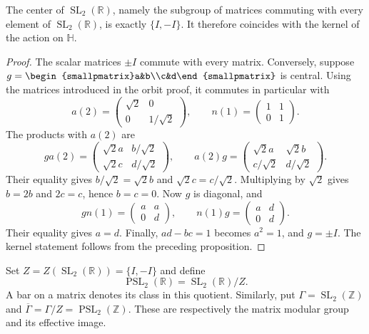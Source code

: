 \begin{proposition}\label{hyperbolic.center}
The center of $\operatorname{SL}_2(\mathbb R)$, namely the subgroup of matrices commuting with every element of $\operatorname{SL}_2(\mathbb R)$, is exactly $\{I,-I\}$. It therefore coincides with the kernel of the action on $\mathbb H$.
\end{proposition}

\begin{proof}
The scalar matrices $\pm I$ commute with every matrix. Conversely, suppose $g=\begin{smallpmatrix}a&b\\c&d\end{smallpmatrix}$ is central. Using the matrices introduced in the orbit proof, it commutes in particular with
\[
 a(2)=\begin{pmatrix}\sqrt2&0\\0&1/\sqrt2\end{pmatrix},\qquad
 n(1)=\begin{pmatrix}1&1\\0&1\end{pmatrix}.
\]
The products with $a(2)$ are
\[
 ga(2)=\begin{pmatrix}\sqrt2 a&b/\sqrt2\\\sqrt2 c&d/\sqrt2\end{pmatrix},\qquad
 a(2)g=\begin{pmatrix}\sqrt2 a&\sqrt2 b\\c/\sqrt2&d/\sqrt2\end{pmatrix}.
\]
Their equality gives $b/\sqrt2=\sqrt2 b$ and $\sqrt2 c=c/\sqrt2$. Multiplying by $\sqrt2$ gives $b=2b$ and $2c=c$, hence $b=c=0$. Now $g$ is diagonal, and
\[
 gn(1)=\begin{pmatrix}a&a\\0&d\end{pmatrix},\qquad
 n(1)g=\begin{pmatrix}a&d\\0&d\end{pmatrix}.
\]
Their equality gives $a=d$. Finally, $ad-bc=1$ becomes $a^2=1$, and $g=\pm I$. The kernel statement follows from the preceding proposition.
\end{proof}

\begin{definition}\label{hyperbolic.projective-group}
Set $Z=Z(\operatorname{SL}_2(\mathbb R))=\{I,-I\}$ and define
\[
 \operatorname{PSL}_2(\mathbb R)=\operatorname{SL}_2(\mathbb R)/Z.
\]
A bar on a matrix denotes its class in this quotient. Similarly, put $\Gamma=\operatorname{SL}_2(\mathbb Z)$ and $\overline\Gamma=\Gamma/Z=\operatorname{PSL}_2(\mathbb Z)$. These are respectively the matrix modular group and its effective image.
\end{definition}

